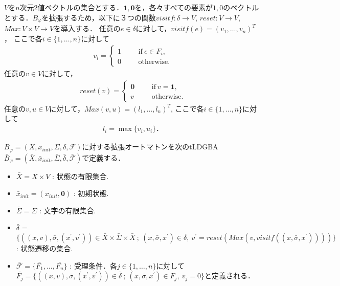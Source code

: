 \documentclass[a4j,9pt,twocolumn]{jsarticle}
\theoremstyle{definition}
\begin{document}
$V$を$n$次元2値ベクトルの集合とする．$\bm{1},\bm{0}$を，各々すべての要素が$1,0$のベクトルとする．$B_{\varphi}$を拡張するため，以下に３つの関数$visitf: \delta \to V$, $reset:V \to V$, $Max:V \times V \to V$を導入する．
任意の$e \in \delta$に対して，$visitf(e) = (v_1,\ldots,v_n)^T$，
ここで各$i \in \{ 1,\dots, n \}$に対して
\begin{align}
 v_i =
  \left\{
  \begin{aligned}
    1 &   & &\text{if}\ e\in F_i, \\
    0 &   & &\text{otherwise}.
  \end{aligned}
  \right. \nonumber
\end{align}
任意の$v \in V$に対して，
\begin{align}
  reset(v) =
  \left\{
  \begin{aligned}
    \bm{0} &   & &\text{if}\  v = \bm{1},\\
    v &   & &\text{otherwise}.
  \end{aligned}
  \right. \nonumber
\end{align}
任意の$v,u \in V$に対して，$Max(v,u) = (l_1, \ldots, l_n)^T$,
ここで各$i \in \{ 1,\dots, n \}$に対して
\begin{align}
  l_i = \max \{ v_i, u_i \}．
\end{align}

$B_\varphi = (X,x_{init},\Sigma,\delta,\mathcal{F})$に対する拡張オートマトンを次のtLDGBA $\bar{B}_{\varphi} = (\bar{X},\bar{x}_{init},\bar{\Sigma},\bar{\delta},\bar{\mathcal{F}})$で定義する．
\begin{itemize}
  \item $\bar{X} = X \times V$ : 状態の有限集合.
  \item $\bar{x}_{init} = (x_{init}, \bm{0})$ : 初期状態.
  \item $\bar{\Sigma} = \Sigma$ : 文字の有限集合.
  \item $\bar{\delta}$ = $\{ ((x,v), \bar{\sigma}, (x^{\prime},v^{\prime})) \in \bar{X} \times \bar{\Sigma} \times \bar{X}\ ;\ (x,\bar{\sigma},x^{\prime}) \in \delta,\ v^{\prime} = reset(Max(v,visitf((x,\bar{\sigma},x^{\prime})))) \}$: 状態遷移の集合.
  \item $\mathcal{\bar{F}} = \{ \bar{F_1}, \ldots ,\bar{F_n} \}$ : 受理条件．各$j \in \{ 1,\ldots,n \}$に対して$\bar{F_j} = \{ ((x,v), \bar{\sigma}, (x^{\prime},v^{\prime})) \in \bar{\delta}\ ;\ (x, \bar{\sigma}, x^{\prime}) \in F_j,\ v_j = 0\}$と定義される．
\end{itemize}
\end{document}
